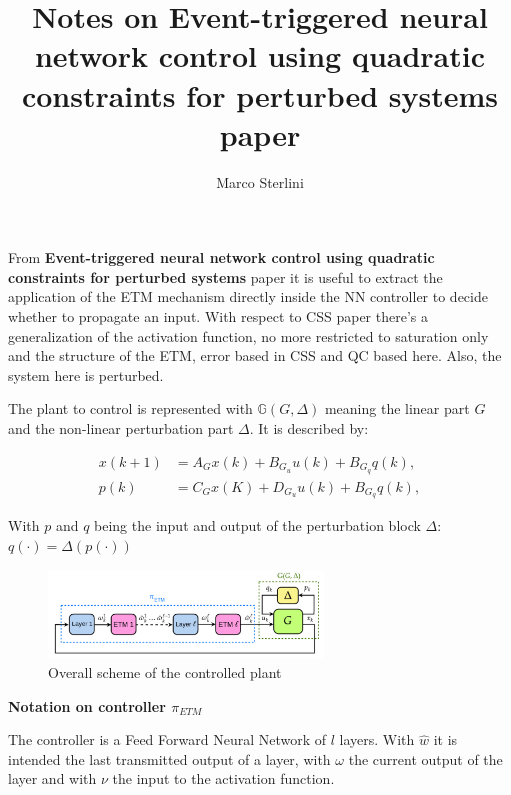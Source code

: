 \documentclass[12pt]{article}
\begin{document}
\date{}
\author{Marco Sterlini}

\title{Notes on Event-triggered neural network control using quadratic constraints for perturbed systems paper}

\maketitle

From \textbf{Event-triggered neural network control using quadratic constraints for perturbed systems} paper it is useful to extract the application of the ETM mechanism directly inside the NN controller to decide whether to propagate an input. 
With respect to CSS paper there's a generalization of the activation function, no more restricted to saturation only and the structure of the ETM, error based in CSS and QC based here. Also, the system here is perturbed.

The plant to control is represented with $\mathbb{G}(G, \Delta)$ meaning the linear part $G$ and the non-linear perturbation part $\Delta$. It is described by:

\begin{equation}
  \begin{aligned}
    x(k+1) &= A_G x(k) + B_{G_u} u(k) + B_{G_q} q(k), \\
    p(k) &= C_G x(K) + D_{G_u} u(k) + B_{G_q} q(k),
  \end{aligned}
\end{equation}

With $p$ and $q$ being the input and output of the perturbation block $\Delta$: $q(\cdot) = \Delta(p(\cdot))$

\begin{figure}[H]
    \centering
    \includegraphics[width=0.65\textwidth]{img/scheme.png}
    \caption{Overall scheme of the controlled plant}
    \label{}
\end{figure}

\textbf{Notation on controller $\pi_{ETM}$}

The controller is a Feed Forward Neural Network of $l$ layers. With $\hat{w}$ it is intended the last transmitted output of a layer, with $\omega$ the current output of the layer and with $\nu$ the input to the activation function.
\end{document}
